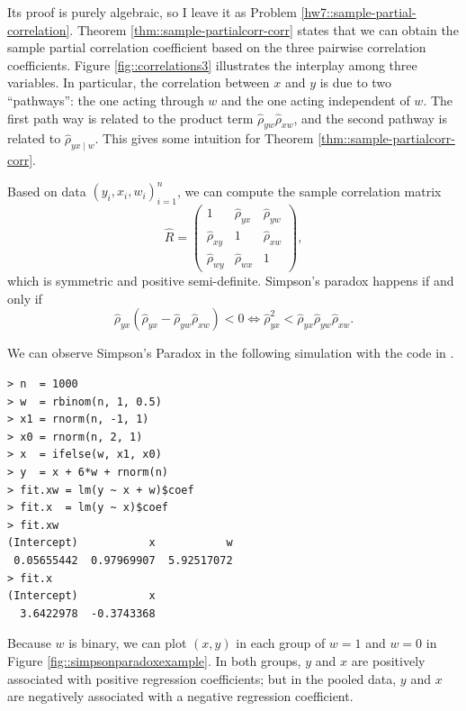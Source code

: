  Its proof is purely algebraic, so I leave it as Problem \ref{hw7::sample-partial-correlation}. Theorem \ref{thm::sample-partialcorr-corr} states that we can obtain the sample partial correlation coefficient based on the three pairwise correlation coefficients. Figure \ref{fig::correlations3} illustrates the interplay among three variables. In particular, the correlation between $x$ and $y$ is due to two ``pathways'': the one acting through $w$ and the one acting independent of $w$. The first path way is related to the product term $ \hat{\rho}_ {yw} \hat{\rho}_ {xw}$, and the second pathway is related to $ \hat{\rho}_ {yx\mid w}$. This gives some intuition for Theorem \ref{thm::sample-partialcorr-corr}. 
 
 
Based on data $(y_{i},x_{i},w_{i})_{i=1}^{n}$, we can compute the
sample correlation matrix
\[
\hat{R}  =\left(\begin{array}{ccc}
1 &  \hat{\rho}_ {yx} &  \hat{\rho}_ {yw}\\
 \hat{\rho}_ {xy} & 1 &  \hat{\rho}_ {xw}\\
 \hat{\rho}_ {wy} &  \hat{\rho}_ {wx} & 1
\end{array}\right),
\]
which is symmetric and positive semi-definite. 
Simpson's paradox happens if and only if
\[
 \hat{\rho}_ {yx}( \hat{\rho}_ {yx}- \hat{\rho}_ {yw} \hat{\rho}_ {xw})<0\Longleftrightarrow  \hat{\rho}_ {yx}^{2}< \hat{\rho}_ {yx} \hat{\rho}_ {yw} \hat{\rho}_ {xw}.
\]
 
 
We can observe Simpson's Paradox in the following simulation with the  code in . 


\begin{lstlisting}
> n  = 1000
> w  = rbinom(n, 1, 0.5)
> x1 = rnorm(n, -1, 1)
> x0 = rnorm(n, 2, 1)
> x  = ifelse(w, x1, x0)
> y  = x + 6*w + rnorm(n)
> fit.xw = lm(y ~ x + w)$coef
> fit.x  = lm(y ~ x)$coef
> fit.xw 
(Intercept)           x           w 
 0.05655442  0.97969907  5.92517072 
> fit.x 
(Intercept)           x 
  3.6422978  -0.3743368 
\end{lstlisting}


Because $w$ is binary, we can plot $(x,y)$ in each group of $w=1$ and $w=0$ in Figure \ref{fig::simpsonparadoxexample}. In both groups, $y$ and $x$ are positively associated with positive regression coefficients; but in the pooled data, $y$ and $x$ are negatively associated with a negative regression coefficient. 

